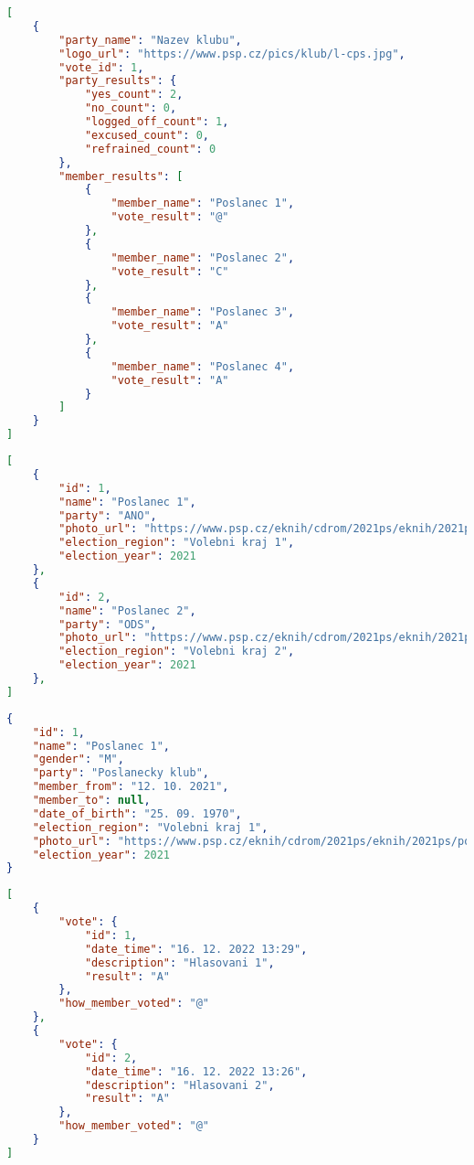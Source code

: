 \begin{lstlisting}[caption={Tělo odpovědi pro dotaz \lstinline{GET /api/party/vote/1}}, label={fig:party-vote-1}, language=json,firstnumber=1,tabsize=2]
[
	{
		"party_name": "Nazev klubu",
		"logo_url": "https://www.psp.cz/pics/klub/l-cps.jpg",
		"vote_id": 1,
		"party_results": {
			"yes_count": 2,
			"no_count": 0,
			"logged_off_count": 1,
			"excused_count": 0,
			"refrained_count": 0
		},
		"member_results": [
			{
				"member_name": "Poslanec 1",
				"vote_result": "@"
			},
			{
				"member_name": "Poslanec 2",
				"vote_result": "C"
			},
			{
				"member_name": "Poslanec 3",
				"vote_result": "A"
			},
			{
				"member_name": "Poslanec 4",
				"vote_result": "A"
			}
		]
	}
]
\end{lstlisting}

\begin{lstlisting}[caption={Tělo odpovědi pro dotaz ¨}, label={fig:member}, language=json,firstnumber=1,tabsize=2]
[
	{
		"id": 1,
		"name": "Poslanec 1",
		"party": "ANO",
		"photo_url": "https://www.psp.cz/eknih/cdrom/2021ps/eknih/2021ps/poslanci/i6474.jpg",
		"election_region": "Volebni kraj 1",
		"election_year": 2021
	},
	{
		"id": 2,
		"name": "Poslanec 2",
		"party": "ODS",
		"photo_url": "https://www.psp.cz/eknih/cdrom/2021ps/eknih/2021ps/poslanci/i6804.jpg",
		"election_region": "Volebni kraj 2",
		"election_year": 2021
	},
]
\end{lstlisting}

\begin{lstlisting}[caption={Tělo odpovědi pro dotaz \lstinline{GET /api/member/1}}, label={fig:member-1}, language=json,firstnumber=1,tabsize=2]
{
	"id": 1,
	"name": "Poslanec 1",
	"gender": "M",
	"party": "Poslanecky klub",
	"member_from": "12. 10. 2021",
	"member_to": null,
	"date_of_birth": "25. 09. 1970",
	"election_region": "Volebni kraj 1",
	"photo_url": "https://www.psp.cz/eknih/cdrom/2021ps/eknih/2021ps/poslanci/i6474.jpg",
	"election_year": 2021
}
\end{lstlisting}

\begin{lstlisting}[caption={Tělo odpovědi pro dotaz \lstinline{GET /api/member/1/vote}}, label={fig:member-vote-1}, language=json,firstnumber=1,tabsize=2]
[
	{
		"vote": {
			"id": 1,
			"date_time": "16. 12. 2022 13:29",
			"description": "Hlasovani 1",
			"result": "A"
		},
		"how_member_voted": "@"
	},
	{
		"vote": {
			"id": 2,
			"date_time": "16. 12. 2022 13:26",
			"description": "Hlasovani 2",
			"result": "A"
		},
		"how_member_voted": "@"
	}
]
\end{lstlisting}

